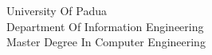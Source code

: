 \begin{titlepage}

		\thispagestyle{empty}
    \begin{figure}
    \centering
      \quad   \hspace{1cm}  
    \end{figure}
    
    \vskip 3cm{
    \begin{center}\sc
        University Of Padua\\
        Department Of Information Engineering\\
        Master Degree In Computer Engineering\end{center}
		}
		

\end{titlepage}
